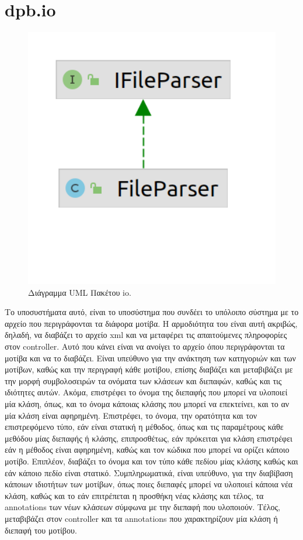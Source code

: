\section{dpb.io}
\label{sec:dpb.io}
\begin{figure}[H]
    \centering
    \includegraphics[width=1.0\textwidth]{Figures/io.png}
    \caption{Διάγραμμα UML Πακέτου io.}
    \label{fig:ioUML}
\end{figure}
Το υποσυστήματα αυτό, είναι το υποσύστημα που συνδέει το υπόλοιπο σύστημα με το αρχείο που περιγράφονται τα διάφορα μοτίβα. 
Η αρμοδιότητα του είναι αυτή ακριβώς, δηλαδή,  να διαβάζει το αρχείο xml και να μεταφέρει τις απαιτούμενες πληροφορίες στον controller. 
Αυτό που κάνει είναι να ανοίγει το αρχείο όπου περιγράφονται τα μοτίβα και να το διαβάζει. 
Είναι υπεύθυνο για την ανάκτηση των κατηγοριών και των μοτίβων, καθώς και την περιγραφή κάθε μοτίβου, 
επίσης διαβάζει και μεταβιβάζει με την μορφή συμβολοσειρών τα ονόματα των κλάσεων και διεπαφών, καθώς και τις ιδιότητες αυτών. Ακόμα, 
επιστρέφει το όνομα της διεπαφής που μπορεί να υλοποιεί μία κλάση, όπως, και το όνομα κάποιας κλάσης που μπορεί να επεκτείνει, 
και το αν μία κλάση είναι αφηρημένη. Επιστρέφει, το όνομα, την ορατότητα και τον επιστρεφόμενο τύπο, εάν είναι στατική η μέθοδος, 
όπως και τις παραμέτρους κάθε μεθόδου μίας διεπαφής ή κλάσης, επιπροσθέτως, εάν πρόκειται για κλάση επιστρέφει 
εάν η μέθοδος είναι αφηρημένη, καθώς και τον κώδικα που μπορεί να ορίζει κάποιο μοτίβο. Επιπλέον, 
διαβάζει το όνομα και τον τύπο κάθε πεδίου μίας κλάσης καθώς και εάν κάποιο πεδίο είναι στατικό.
Συμπληρωματικά, είναι υπεύθυνο, για την διαβίβαση κάποιων ιδιοτήτων των μοτίβων, όπως ποιες διεπαφές μπορεί 
να υλοποιεί κάποια νέα κλάση, καθώς και το εάν επιτρέπεται η προσθήκη νέας κλάσης και τέλος, τα annotations των νέων κλάσεων 
σύμφωνα με την διεπαφή που υλοποιούν. Τέλος, μεταβιβάζει στον controller και τα annotations που χαρακτηρίζουν μία κλάση ή διεπαφή του μοτίβου.
